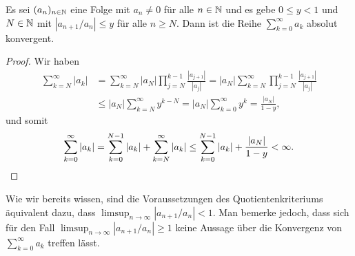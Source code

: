 \documentclass[a4paper,10pt]{article}
\begin{document}
\begin{prop}
 Es sei $(a_n)_{n \in \mathbb{N}}$ eine Folge mit $a_n \neq 0$ für alle $n \in \mathbb{N}$ und es gebe $0 \leq y < 1$ und $N \in \mathbb{N}$ mit $|a_{n+1}/a_n| \leq y$ für alle $n \geq N$. Dann ist die Reihe $\sum_{k=0}^\infty a_k$ absolut konvergent.
\end{prop}
\begin{proof}
 Wir haben
 \begin{align*}
  \sum_{k=N}^\infty |a_k|
  &= \sum_{k=N}^\infty |a_N| \prod_{j=N}^{k-1} \frac{|a_{j+1}|}{|a_j|}
  = |a_N| \sum_{k=N}^\infty \prod_{j=N}^{k-1} \frac{|a_{j+1}|}{|a_j|} \\
  &\leq |a_N| \sum_{k=N}^\infty y^{k-N}
  = |a_N| \sum_{k=0}^\infty y^k
  = \frac{|a_N|}{1-y},
 \end{align*}
 und somit
 \[
  \sum_{k=0}^\infty |a_k|
  = \sum_{k=0}^{N-1} |a_k| + \sum_{k=N}^\infty |a_k|
  \leq \sum_{k=0}^{N-1} |a_k| + \frac{|a_N|}{1-y}
  < \infty.
  \qedhere
 \]
\end{proof}


Wie wir bereits wissen, sind die Voraussetzungen des Quotientenkriteriums äquivalent dazu, dass $\limsup_{n \to \infty} |a_{n+1}/a_n| < 1$. Man bemerke jedoch, dass sich für den Fall $\limsup_{n \to \infty} |a_{n+1}/a_n| \geq 1$ keine Aussage über die Konvergenz von $\sum_{k=0}^\infty a_k$ treffen lässt.
\end{document}
